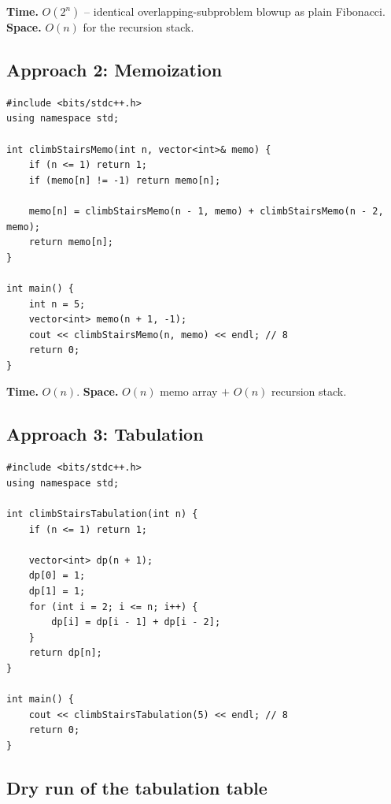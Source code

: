 \begin{complexitybox}
\textbf{Time.} $O(2^n)$ -- identical overlapping-subproblem blowup as
plain Fibonacci.
\textbf{Space.} $O(n)$ for the recursion stack.
\end{complexitybox}

\subsection*{Approach 2: Memoization}

\begin{lstlisting}
#include <bits/stdc++.h>
using namespace std;

int climbStairsMemo(int n, vector<int>& memo) {
    if (n <= 1) return 1;
    if (memo[n] != -1) return memo[n];

    memo[n] = climbStairsMemo(n - 1, memo) + climbStairsMemo(n - 2, memo);
    return memo[n];
}

int main() {
    int n = 5;
    vector<int> memo(n + 1, -1);
    cout << climbStairsMemo(n, memo) << endl; // 8
    return 0;
}
\end{lstlisting}

\begin{complexitybox}
\textbf{Time.} $O(n)$.
\textbf{Space.} $O(n)$ memo array $+$ $O(n)$ recursion stack.
\end{complexitybox}

\subsection*{Approach 3: Tabulation}

\begin{lstlisting}
#include <bits/stdc++.h>
using namespace std;

int climbStairsTabulation(int n) {
    if (n <= 1) return 1;

    vector<int> dp(n + 1);
    dp[0] = 1;
    dp[1] = 1;
    for (int i = 2; i <= n; i++) {
        dp[i] = dp[i - 1] + dp[i - 2];
    }
    return dp[n];
}

int main() {
    cout << climbStairsTabulation(5) << endl; // 8
    return 0;
}
\end{lstlisting}

\subsection*{Dry run of the tabulation table}

